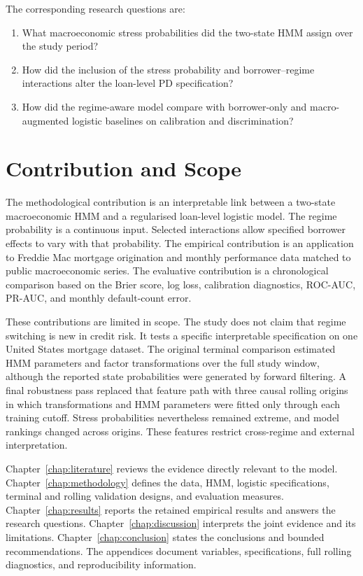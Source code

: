 The corresponding research questions are:
\begin{enumerate}
    \item What macroeconomic stress probabilities did the two-state HMM assign over the study period?
    \item How did the inclusion of the stress probability and borrower--regime interactions alter the loan-level PD specification?
    \item How did the regime-aware model compare with borrower-only and macro-augmented logistic baselines on calibration and discrimination?
\end{enumerate}

\section{Contribution and Scope}

The methodological contribution is an interpretable link between a two-state macroeconomic HMM and a regularised loan-level logistic model. The regime probability is a continuous input. Selected interactions allow specified borrower effects to vary with that probability. The empirical contribution is an application to Freddie Mac mortgage origination and monthly performance data matched to public macroeconomic series. The evaluative contribution is a chronological comparison based on the Brier score, log loss, calibration diagnostics, ROC-AUC, PR-AUC, and monthly default-count error.

These contributions are limited in scope. The study does not claim that regime switching is new in credit risk. It tests a specific interpretable specification on one United States mortgage dataset. The original terminal comparison estimated HMM parameters and factor transformations over the full study window, although the reported state probabilities were generated by forward filtering. A final robustness pass replaced that feature path with three causal rolling origins in which transformations and HMM parameters were fitted only through each training cutoff. Stress probabilities nevertheless remained extreme, and model rankings changed across origins. These features restrict cross-regime and external interpretation.

Chapter~\ref{chap:literature} reviews the evidence directly relevant to the model. Chapter~\ref{chap:methodology} defines the data, HMM, logistic specifications, terminal and rolling validation designs, and evaluation measures. Chapter~\ref{chap:results} reports the retained empirical results and answers the research questions. Chapter~\ref{chap:discussion} interprets the joint evidence and its limitations. Chapter~\ref{chap:conclusion} states the conclusions and bounded recommendations. The appendices document variables, specifications, full rolling diagnostics, and reproducibility information.

